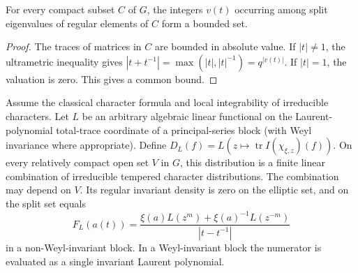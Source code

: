 \begin{lemma}\label{lem:compact-exponents}
For every compact subset $C$ of $G$, the integers $v(t)$ occurring among split eigenvalues of regular elements of $C$ form a bounded set.
\end{lemma}
\begin{proof}
The traces of matrices in $C$ are bounded in absolute value. If $|t|\ne1$, the ultrametric inequality gives $|t+t^{-1}|=\max(|t|,|t|^{-1})=q^{|v(t)|}$. If $|t|=1$, the valuation is zero. This gives a common bound.
\end{proof}

\begin{theorem}\label{thm:local-interpolation}
Assume the classical character formula and local integrability of irreducible characters. Let $L$ be an arbitrary algebraic linear functional on the Laurent-polynomial total-trace coordinate of a principal-series block (with Weyl invariance where appropriate). Define $D_L(f)=L(z\mapsto\operatorname{tr}I(\chi_{\xi,z})(f))$. On every relatively compact open set $V$ in $G$, this distribution is a finite linear combination of irreducible tempered character distributions. The combination may depend on $V$. Its regular invariant density is zero on the elliptic set, and on the split set equals
\[
F_L(a(t))=
\frac{\xi(a)L(z^m)+\xi(a)^{-1}L(z^{-m})}{|t-t^{-1}|}
\]
in a non-Weyl-invariant block. In a Weyl-invariant block the numerator is evaluated as a single invariant Laurent polynomial.
\end{theorem}
